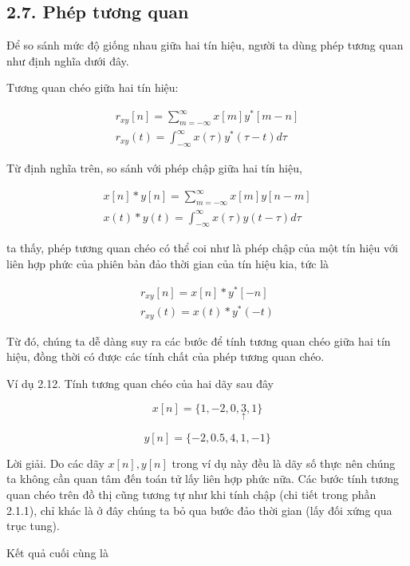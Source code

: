 \documentclass[
  10
]{article}
\begin{document}
\subsection{2.7. Phép tương quan}\label{phuxe9p-tux1b0ux1a1ng-quan}

Để so sánh mức độ giống nhau giữa hai tín hiệu, người ta dùng phép tương
quan như định nghĩa dưới đây.

Tương quan chéo giữa hai tín hiệu:

\[
\begin{array}{l} r _ {x y} [ n ] = \sum_ {m = - \infty} ^ {\infty} x [ m ] y ^ {*} [ m - n ] \\ r _ {x y} (t) = \int_ {- \infty} ^ {\infty} x (\tau) y ^ {*} (\tau - t) d \tau \end{array}
\]

Từ định nghĩa trên, so sánh với phép chập giữa hai tín hiệu,

\[
\begin{array}{l} x [ n ] * y [ n ] = \sum_ {m = - \infty} ^ {\infty} x [ m ] y [ n - m ] \\ x (t) * y (t) = \int_ {- \infty} ^ {\infty} x (\tau) y (t - \tau) d \tau \end{array}
\]

ta thấy, phép tương quan chéo có thể coi như là phép chập của một tín
hiệu với liên hợp phức của phiên bản đảo thời gian của tín hiệu kia, tức
là

\[
\begin{array}{r} r _ {x y} [ n ] = x [ n ] * y ^ {*} [ - n ] \\ r _ {x y} (t) = x (t) * y ^ {*} (- t) \end{array}
\]

Từ đó, chúng ta dễ dàng suy ra các bước để tính tương quan chéo giữa hai
tín hiệu, đồng thời có được các tính chất của phép tương quan chéo.

Ví dụ 2.12. Tính tương quan chéo của hai dãy sau đây

\[
x [ n ] = \{1, - 2, 0, \underset {\uparrow} {3}, 1 \}
\]

\[
y [ n ] = \{- 2, 0. 5, 4, 1, - 1 \}
\]

Lời giải. Do các dãy \(x [ n ] , y [ n ]\) trong ví dụ này đều là dãy số
thực nên chúng ta không cần quan tâm đến toán tử lấy liên hợp phức nữa.
Các bước tính tương quan chéo trên đồ thị cũng tương tự như khi tính
chập (chi tiết trong phần 2.1.1), chỉ khác là ở đây chúng ta bỏ qua bước
đảo thời gian (lấy đối xứng qua trục tung).

Kết quả cuối cùng là
\end{document}
